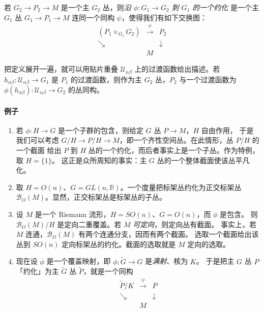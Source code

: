 \begin{definition}[原文未编号]
  若 $G_2\to P_2\to M$ 是一个主 $G_2$ 丛，则\emph{沿 $\phi:G_1\to G_2$ 到 $G_1$ 的一个约化}
  是一个主 $G_1$ 丛 $G_1\to P_1\to M$ 连同一个同构 $\psi$，使得我们有如下交换图：
\begin{equation}
  \begin{array}{ccc}
    (P_1\times_{G_1}G_2) & \xrightarrow{\ \psi\ } & P_2\\[4pt]
    \searrow & & \downarrow\\[4pt]
    & M &
  \end{array}
  \tag{G.1}
  \label{eq:G.1}
\end{equation}
\end{definition}

把定义展开一遍，就可以用贴片重叠 $\mathcal{U}_{\alpha\beta}$ 上的过渡函数给出描述。若
$h_{\alpha\beta}:\mathcal{U}_{\alpha\beta}\to G_1$ 是 $P_1$ 的过渡函数，则作为主 $G_2$ 丛，$P_2$
与一个过渡函数为 $\phi(h_{\alpha\beta}):\mathcal{U}_{\alpha\beta}\to G_2$ 的丛同构。

\paragraph{例子}
\begin{enumerate}
  \item 若 $\phi:H\to G$ 是一个子群的包含，则给定 $G$ 丛 $P\to M$，$H$ 自由作用，
    于是我们可以考虑 $G/H\to P/H\to M$，即一个齐性空间丛。在此情形，丛 $P/H$ 的一个截面
    给出 $P$ 到 $H$ 丛的一个约化，而后者事实上是一个子丛。作为特例，取 $H = \{1\}$。
    这正是众所周知的事实：主 $G$ 丛的一个整体截面使该丛平凡化。
  \item 取 $H = O(n)$、$G = GL(n,\mathbb{R})$。一个度量把标架丛约化为正交标架丛
    $\mathcal{B}_O(M)$。显然，正交标架丛是标架丛的子丛。
  \item 设 $M$ 是一个 Riemann 流形，$H = SO(n)$、$G = O(n)$，而 $\phi$ 是包含。
    则 $\mathcal{B}_O(M)/H$ 是定向二重覆盖。若 $M$ \emph{可定向}，则定向丛有截面。
    事实上，若 $M$ 连通，$\mathcal{B}_O(M)$ 有两个连通分支，因而有两个截面。
    选取一个截面给出该丛到 $SO(n)$ 定向标架丛的约化。截面的选取就是 $M$ 定向的选取。
  \item 现在设 $\phi$ 是一个覆盖映射，即 $\phi:\tilde G\to G$ 是\emph{满射}、核为 $K$。
    于是把主 $G$ 丛 $P$「约化」为主 $\tilde G$ 丛 $\tilde P$，就是一个同构
\begin{equation}
  \begin{array}{ccc}
    \tilde P/K & \xrightarrow{\ \psi\ } & P\\[4pt]
    \searrow & & \downarrow\\[4pt]
    & M &
  \end{array}
  \tag{G.2}
  \label{eq:G.2}
\end{equation}
\end{enumerate}

